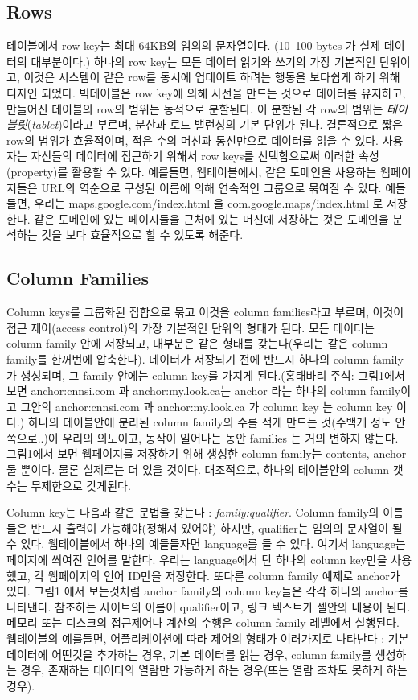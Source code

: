 \documentclass[twocolumn]{article}
\begin{document}
 
\subsection*{Rows}
 테이블에서 row key는 최대 64KB의 임의의 문자열이다. (10~100 bytes 가 실제 데이터의 대부분이다.)
하나의 row key는 모든 데이터 읽기와 쓰기의 가장 기본적인 단위이고, 이것은 시스템이 같은 row를 동시에 업데이트 하려는 행동을 보다쉽게 하기 위해 디자인 되었다.
 빅테이블은 row key에 의해 사전을 만드는 것으로 데이터를 유지하고, 만들어진 테이블의 row의 범위는 동적으로 분할된다. 이 분할된 각 row의 범위는 \textit{테이블릿}(\textit{tablet})이라고 부르며, 분산과 로드 밸런싱의 기본 단위가 된다. 결론적으로 짧은 row의 범위가 효율적이며, 적은 수의 머신과 통신만으로 데이터를 읽을 수 있다. 사용자는 자신들의 데이터에 접근하기 위해서 row keys를 선택함으로써 이러한 속성(property)를 활용할 수 있다.
예를들면, 웹테이블에서, 같은 도메인을 사용하는 웹페이지들은 URL의 역순으로 구성된 이름에 의해 연속적인 그룹으로 묶여질 수 있다. 예들들면, 우리는 maps.google.com/index.html 을 com.google.maps/index.html 로 저장한다. 같은 도메인에 있는 페이지들을 근처에 있는 머신에 저장하는 것은 도메인을 분석하는 것을 보다 효율적으로 할 수 있도록 해준다.
 
\subsection*{Column Families}
 Column keys를 그룹화된 집합으로 묶고 이것을 column families라고 부르며, 이것이 접근 제어(access control)의 가장 기본적인 단위의 형태가 된다. 모든 데이터는 column family 안에 저장되고, 대부분은 같은 형태를 갖는다(우리는 같은 column family를 한꺼번에 압축한다). 데이터가 저장되기 전에 반드시 하나의 column family가 생성되며, 그 family 안에는 column key를 가지게 된다.(홍태바리 주석: 그림1에서 보면 anchor:cnnsi.com 과 anchor:my.look.ca는 anchor 라는 하나의 column family이고 그안의 anchor:cnnsi.com 과 anchor:my.look.ca 가 column key 는 column key 이다.)
하나의 테이블안에 분리된 column family의 수를 적게 만드는 것(수백개 정도 안쪽으로..)이 우리의 의도이고, 동작이 일어나는 동안 families 는 거의 변하지 않는다. 그림1에서 보면 웹페이지를 저장하기 위해 생성한 column family는 contents, anchor 둘 뿐이다. 물론 실제로는 더 있을 것이다. 대조적으로, 하나의 테이블안의 column 갯수는 무제한으로 갖게된다.

Column key는 다음과 같은 문법을 갖는다 :
\textit{ family:qualifier}. Column family의 이름들은 반드시 출력이 가능해야(정해져 있어야) 하지만, qualifier는 임의의 문자열이 될 수 있다. 웹테이블에서 하나의 예들들자면 language를 들 수 있다. 여기서 language는 페이지에 씌여진 언어를 말한다. 우리는 language에서 단 하나의 column key만을 사용했고, 각 웹페이지의 언어 ID만을 저장한다. 또다른 column family 예제로 anchor가 있다. 그림1 에서 보는것처럼 anchor family의 column key들은 각각 하나의 anchor를 나타낸다. 참조하는 사이트의 이름이 qualifier이고, 링크 텍스트가 셀안의 내용이 된다.
 메모리 또는 디스크의 접근제어나 계산의 수행은 column family 레벨에서 실행된다. 웹테이블의 예를들면, 어플리케이션에 따라 제어의 형태가 여러가지로 나타난다 : 기본 데이터에 어떤것을 추가하는 경우, 기본 데이터를 읽는 경우, column family를 생성하는 경우, 존재하는 데이터의 열람만 가능하게 하는 경우(또는 열람 조차도 못하게 하는 경우).
 
\end{document}
